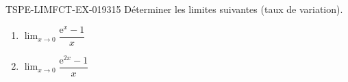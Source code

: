 \begin{exercice}{TSPE-LIMFCT-EX-019}{3}{15}
Déterminer les limites suivantes (taux de variation).
\begin{enumerate}
  \item $\lim_{x \to 0} \dfrac{\mathrm{e}^x - 1}{x}$
  \item $\lim_{x \to 0} \dfrac{\mathrm{e}^{2x} - 1}{x}$
\end{enumerate}
\end{exercice}
